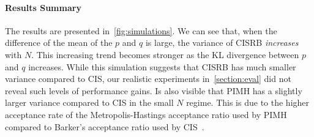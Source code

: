 \paragraph{Results Summary}
The results are presented in~\cref{fig:simulations}.
We can see that, when the difference of the mean of the \(p\) and \(q\) is large, the variance of CISRB \textit{increases} with \(N\).
This increasing trend becomes stronger as the KL divergence between \(p\) and \(q\) increases.
While this simulation suggests that CISRB has much smaller variance compared to CIS, our realistic experiments in~\cref{section:eval} did not reveal such levels of performance gains.
Is also visible that PIMH has a slightly larger variance compared to CIS in the small \(N\) regime.
This is due to the higher acceptance rate of the Metropolis-Hastings acceptance ratio used by PIMH compared to Barker's acceptance ratio used by CIS~\citep{peskun_optimum_1973, minh_understanding_2015}.

